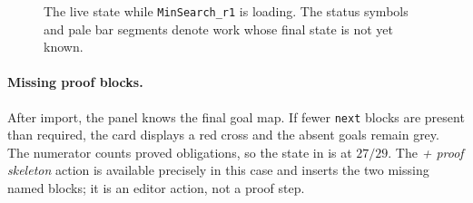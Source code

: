 \begin{figure}[ht!]
{%
  }
  \caption{The live state while \texttt{MinSearch\_r1} is loading.  The
    status symbols and pale bar segments denote work whose final state is not
    yet known.}
  \label{fig:barrel-state-loading}
\end{figure}
\FloatBarrier

\paragraph*{Missing proof blocks.}
After import, the panel knows the final goal map.  If fewer
\texttt{next} blocks are present than required, the card displays a red cross
and the absent goals remain grey.  The numerator counts proved obligations, so
the state in  is at $27/29$.  The
\emph{+ proof skeleton} action is available precisely in this case and inserts
the two missing named blocks; it is an editor action, not a proof step.

